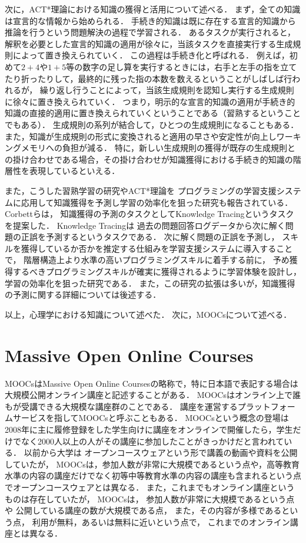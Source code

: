 次に，ACT*理論における知識の獲得と活用について述べる．
まず，全ての知識は宣言的な情報から始められる．
手続き的知識は既に存在する宣言的知識から推論を行うという問題解決の過程で学習される．
あるタスクが実行されると，解釈を必要とした宣言的知識の適用が徐々に，当該タスクを直接実行する生成規則によって置き換えられていく．
この過程は手続き化と呼ばれる．
例えば，初めて$2+4$や$1+5$等の数字の足し算を実行するときには，右手と左手の指を立てたり折ったりして，最終的に残った指の本数を数えるということがしばしば行われる\cite{gersten1999number}が，
繰り返し行うことによって，当該生成規則を認知し実行する生成規則に徐々に置き換えられていく．
つまり，明示的な宣言的知識の適用が手続き的知識の直接的適用に置き換えられていくということである（習熟するということでもある）．
生成規則の系列が結合して，ひとつの生成規則になることもある．
また，知識が生成規則の形式に変換されると適用の早さや安定性が向上しワーキングメモリへの負担が減る．
特に，新しい生成規則の獲得が既存の生成規則との掛け合わせである場合，その掛け合わせが知識獲得における手続き的知識の階層性を表現しているといえる．


また，こうした習熟学習の研究やACT*理論を
プログラミングの学習支援システムに応用して知識獲得を予測し学習の効率化を狙った研究も報告されている．
Corbettら\cite{corbett1994knowledge}は，
知識獲得の予測のタスクとしてKnowledge Tracingというタスクを提案した．
Knowledge Tracingは
過去の問題回答ログデータから次に解く問題の正誤を予測するというタスクである．
次に解く問題の正誤を予測し，
スキルを獲得しているか否かを推定する仕組みを学習支援システムに導入することで，
階層構造上より水準の高いプログラミングスキルに着手する前に，
予め獲得するべきプログラミングスキルが確実に獲得されるように学習体験を設計し，
学習の効率化を狙った研究である．
また，この研究の拡張は多いが，知識獲得の予測に関する詳細については後述する．


\vvspace
以上，心理学における知識について述べた．
次に，MOOCsについて述べる．





\section{Massive Open Online Courses}
MOOCsはMassive Open Online Courses\cite{mcauley2010mooc, pappano2012year,siemens2013massive}の略称で，特に日本語で表記する場合は大規模公開オンライン講座と記述することがある．
MOOCsはオンライン上で誰もが受講できる大規模な講座群のことである．
講座を運営するプラットフォームサービスを指してMOOCsと呼ぶこともある．
MOOCsという概念の登場は2008年に主に履修登録をした学生向けに講座をオンラインで開催したら，学生だけでなく2000人以上の人がその講座に参加したことがきっかけだと言われている\cite{yuan2013moocs}．
以前から大学は
オープンコースウェア\cite{abelson2008creation}という形で講義の動画や資料を公開していたが，
MOOCsは，参加人数が非常に大規模であるという点や，高等教育水準の内容の講座だけでなく初等中等教育水準の内容の講座も含まれるという点でオープンコースウェアとは異なる．
また，これまでもオンライン講座というものは存在していたが，
MOOCsは，
参加人数が非常に大規模であるという点や
公開している講座の数が大規模である点，
また，その内容が多様であるという点，
利用が無料，あるいは無料に近いという点で，
これまでのオンライン講座とは異なる．

